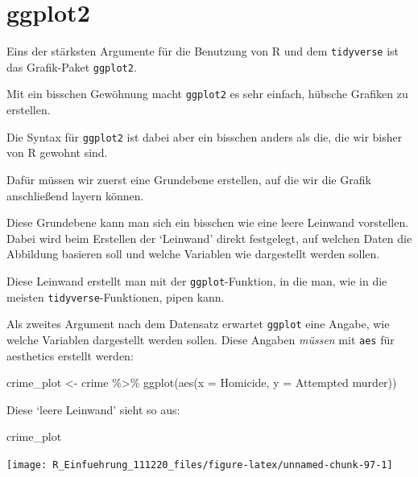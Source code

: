 \documentclass[
]{book}
\newenvironment{Shaded}{\begin{snugshade}}{\end{snugshade}}
\newcommand{\AttributeTok}[1]{\textcolor[rgb]{0.77,0.63,0.00}{#1}}
\newcommand{\FunctionTok}[1]{\textcolor[rgb]{0.00,0.00,0.00}{#1}}
\newcommand{\NormalTok}[1]{#1}
\newcommand{\OtherTok}[1]{\textcolor[rgb]{0.56,0.35,0.01}{#1}}
\newcommand{\SpecialCharTok}[1]{\textcolor[rgb]{0.00,0.00,0.00}{#1}}
\newcommand{\StringTok}[1]{\textcolor[rgb]{0.31,0.60,0.02}{#1}}
\begin{document}
\hypertarget{ggplot2}{%
\section{ggplot2}\label{ggplot2}}

Eins der stärksten Argumente für die Benutzung von R und dem \texttt{tidyverse} ist das Grafik-Paket \texttt{ggplot2}.

Mit ein bisschen Gewöhnung macht \texttt{ggplot2} es sehr einfach, hübsche Grafiken zu erstellen.

Die Syntax für \texttt{ggplot2} ist dabei aber ein bisschen anders als die, die wir bisher von R gewohnt sind.

Dafür müssen wir zuerst eine Grundebene erstellen, auf die wir die Grafik anschließend layern können.

Diese Grundebene kann man sich ein bisschen wie eine leere Leinwand vorstellen.
Dabei wird beim Erstellen der `Leinwand' direkt festgelegt, auf welchen Daten die Abbildung basieren soll und welche Variablen wie dargestellt werden sollen.

Diese Leinwand erstellt man mit der \texttt{ggplot}-Funktion, in die man, wie in die meisten \texttt{tidyverse}-Funktionen, pipen kann.

Als zweites Argument nach dem Datensatz erwartet \texttt{ggplot} eine Angabe, wie welche Variablen dargestellt werden sollen. Diese Angaben \emph{müssen} mit \texttt{aes} für aesthetics erstellt werden:

\begin{Shaded}
\begin{Highlighting}[]
\NormalTok{crime\_plot }\OtherTok{\textless{}{-}}\NormalTok{ crime }\SpecialCharTok{\%\textgreater{}\%} 
  \FunctionTok{ggplot}\NormalTok{(}\FunctionTok{aes}\NormalTok{(}\AttributeTok{x =}\NormalTok{ Homicide, }\AttributeTok{y =} \StringTok{\textasciigrave{}}\AttributeTok{Attempted murder}\StringTok{\textasciigrave{}}\NormalTok{))}
\end{Highlighting}
\end{Shaded}

Diese `leere Leinwand' sieht so aus:

\begin{Shaded}
\begin{Highlighting}[]
\NormalTok{crime\_plot}
\end{Highlighting}
\end{Shaded}

\begin{center}\texttt{[image: R\_Einfuehrung\_111220\_files/figure-latex/unnamed-chunk-97-1]} \end{center}
\end{document}
